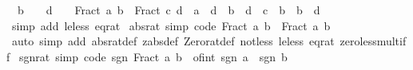\begin{isabellebody}
\ \ {\isachardoublequoteopen}b\ {\isasymnoteq}\ {}\ {\isasymLongrightarrow}\ d\ {\isasymnoteq}\ {}\ {\isasymLongrightarrow}\ Fract\ a\ b\ {\isasymle}\ Fract\ c\ d\ {\isasymlongleftrightarrow}\ {\isacharparenleft}{\kern0pt}a\ {\isacharasterisk}{\kern0pt}\ d{\isacharparenright}{\kern0pt}\ {\isacharasterisk}{\kern0pt}\ {\isacharparenleft}{\kern0pt}b\ {\isacharasterisk}{\kern0pt}\ d{\isacharparenright}{\kern0pt}\ {\isasymle}\ {\isacharparenleft}{\kern0pt}c\ {\isacharasterisk}{\kern0pt}\ b{\isacharparenright}{\kern0pt}\ {\isacharasterisk}{\kern0pt}\ {\isacharparenleft}{\kern0pt}b\ {\isacharasterisk}{\kern0pt}\ d{\isacharparenright}{\kern0pt}{\isachardoublequoteclose}\isanewline
%
\isadelimproof
\ \ %
\endisadelimproof
%
\isatagproof
{}\isamarkupfalse%
\ {\isacharparenleft}{\kern0pt}simp\ add{\isacharcolon}{\kern0pt}\ le{\isacharunderscore}{\kern0pt}less\ eq{\isacharunderscore}{\kern0pt}rat{\isacharparenright}{\kern0pt}%
\endisatagproof
{\isafoldproof}%
%
\isadelimproof
\isanewline
%
\endisadelimproof
\isanewline
{}\isamarkupfalse%
\ abs{\isacharunderscore}{\kern0pt}rat\ {\isacharbrackleft}{\kern0pt}simp{\isacharcomma}{\kern0pt}\ code{\isacharbrackright}{\kern0pt}{\isacharcolon}{\kern0pt}\ {\isachardoublequoteopen}{\isasymbar}Fract\ a\ b{\isasymbar}\ {\isacharequal}{\kern0pt}\ Fract\ {\isasymbar}a{\isasymbar}\ {\isasymbar}b{\isasymbar}{\isachardoublequoteclose}\isanewline
%
\isadelimproof
\ \ %
\endisadelimproof
%
\isatagproof
{}\isamarkupfalse%
\ {\isacharparenleft}{\kern0pt}auto\ simp\ add{\isacharcolon}{\kern0pt}\ abs{\isacharunderscore}{\kern0pt}rat{\isacharunderscore}{\kern0pt}def\ zabs{\isacharunderscore}{\kern0pt}def\ Zero{\isacharunderscore}{\kern0pt}rat{\isacharunderscore}{\kern0pt}def\ not{\isacharunderscore}{\kern0pt}less\ le{\isacharunderscore}{\kern0pt}less\ eq{\isacharunderscore}{\kern0pt}rat\ zero{\isacharunderscore}{\kern0pt}less{\isacharunderscore}{\kern0pt}mult{\isacharunderscore}{\kern0pt}iff{\isacharparenright}{\kern0pt}%
\endisatagproof
{\isafoldproof}%
%
\isadelimproof
\isanewline
%
\endisadelimproof
\isanewline
{}\isamarkupfalse%
\ sgn{\isacharunderscore}{\kern0pt}rat\ {\isacharbrackleft}{\kern0pt}simp{\isacharcomma}{\kern0pt}\ code{\isacharbrackright}{\kern0pt}{\isacharcolon}{\kern0pt}\ {\isachardoublequoteopen}sgn\ {\isacharparenleft}{\kern0pt}Fract\ a\ b{\isacharparenright}{\kern0pt}\ {\isacharequal}{\kern0pt}\ of{\isacharunderscore}{\kern0pt}int\ {\isacharparenleft}{\kern0pt}sgn\ a\ {\isacharasterisk}{\kern0pt}\ sgn\ b{\isacharparenright}{\kern0pt}{\isachardoublequoteclose}\isanewline

\end{isabellebody}
